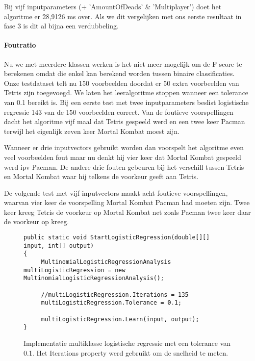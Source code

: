 Bij vijf inputparameters (+ 'AmountOfDeads' \& 'Multiplayer') doet het algoritme er 28,9126 ms over. Als we dit vergelijken met ons eerste resultaat in fase 3 is dit al bijna een verdubbeling. 

\paragraph{Foutratio} 

Nu we met meerdere klassen werken is het niet meer mogelijk om de F-score te berekenen omdat die enkel kan berekend worden tussen binaire classificaties. Onze testdataset telt nu 150 voorbeelden doordat er 50 extra voorbeelden van Tetris zijn toegevoegd. We laten het leeralgoritme stoppen wanneer een tolerance van 0.1 bereikt is. Bij een eerste test met twee inputparameters beslist logistische regressie 143 van de 150 voorbeelden correct. Van de foutieve voorspellingen dacht het algoritme vijf maal dat Tetris gespeeld werd en een twee keer Pacman terwijl het eigenlijk zeven keer Mortal Kombat moest zijn. 

Wanneer er drie inputvectors gebruikt worden dan voorspelt het algoritme even veel voorbeelden fout maar nu denkt hij vier keer dat Mortal Kombat gespeeld werd ipv Pacman. De andere drie fouten gebeuren bij het verschill tussen Tetris en Mortal Kombat waar hij telkens de voorkeur geeft aan Tetris.

De volgende test met vijf inputvectors maakt acht foutieve voorspellingen, waarvan vier keer de voorspelling Mortal Kombat Pacman had moeten zijn. Twee keer kreeg Tetris de voorkeur op Mortal Kombat net zoals Pacman twee keer daar de voorkeur op kreeg.


\begin{figure}[]
	\renewcommand{\figurename}{Code}
\begin{lstlisting}
public static void StartLogisticRegression(double[][] input, int[] output)
{
     MultinomialLogisticRegressionAnalysis multiLogisticRegression = new MultinomialLogisticRegressionAnalysis();

	 //multiLogisticRegression.Iterations = 135
	 multiLogisticRegression.Tolerance = 0.1;

     multiLogisticRegression.Learn(input, output);
}

\end{lstlisting}
\caption{Implementatie multiklasse logistische regressie met een tolerance van 0.1. Het Iterations property werd gebruikt om de snelheid te meten.}
\label{code:logistischeregressiefase3}
\end{figure}


